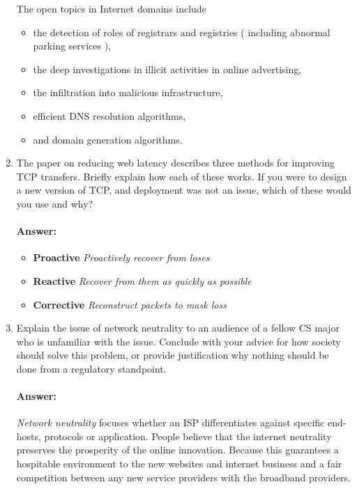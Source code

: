 \documentclass[a4paper,11pt]{article}
\theoremstyle{mytheor}
\begin{document}
\begin{enumerate}
The open topics in Internet domains include
\begin{itemize}
\item the detection of roles of registrars and registries ( including abnormal parking services ),
\item the deep investigations in illicit activities in online advertising,
\item the infiltration into malicious infrastructure,
\item efficient DNS resolution algorithms,
\item and domain generation algorithms.
\end{itemize}
\begin{comment}
\item 
The paper on SSL, HTTPS, and trust models describes a number of flaws with our system for secure communication. 
Choose three of these you feel are most important. 
Describe the aw and explain why this is a critical area where improvement is needed.
\paragraph{Answer:}
xx
\end{comment}
\item
The paper on reducing web latency describes three methods for improving TCP transfers. 
Briefly explain how each of these works. 
If you were to design a new version of TCP, and deployment was not an issue, which of these would you use and why?
\paragraph{Answer:}
\begin{itemize}
\item \textbf{Proactive} \emph{Proactively recover from loses}
\item \textbf{Reactive} \emph{Recover from them as quickly as possible}
\item \textbf{Corrective} \emph{Reconstruct packets to mask loss}
\end{itemize}
\item
Explain the issue of network neutrality to an audience of a fellow CS major who is unfamiliar with the issue.
Conclude with your advice for how society should solve this problem, or provide justification why nothing should be done from a regulatory standpoint.
\paragraph{Answer:}
\emph{Network neutrality} focuses whether an ISP differentiates against specific end-hosts, protocols or application.
People believe that the internet neutrality preserves the prosperity of the online innovation.
Because this guarantees a hospitable environment to the new websites and internet business and a fair competition between any new service providers with the broadband providers.


\end{enumerate}
\end{document}
